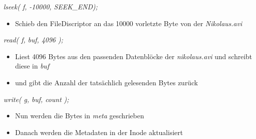 \documentclass{ti2}
\begin{document}
\emph{lseek( f, -10000, SEEK\_END);}

\begin{itemize}
	\item Schieb den FileDiscriptor an das 10000 vorletzte Byte von der
	\emph{Nikolaus.avi}
\end{itemize}

\emph{read( f, buf, 4096 );}

\begin{itemize}
	\item Liest 4096 Bytes aus den passenden Datenblöcke der \emph{nikolaus.avi}
	und schreibt diese in \emph{buf}
	\item und gibt die Anzahl der tatsächlich gelesenden Bytes zurück
\end{itemize}

\emph{write( g, buf, count );}

\begin{itemize}
	\item Nun werden die Bytes in \emph{meta} geschrieben
	\item Danach werden die Metadaten in der Inode aktualisiert
\end{itemize}
\end{document}
